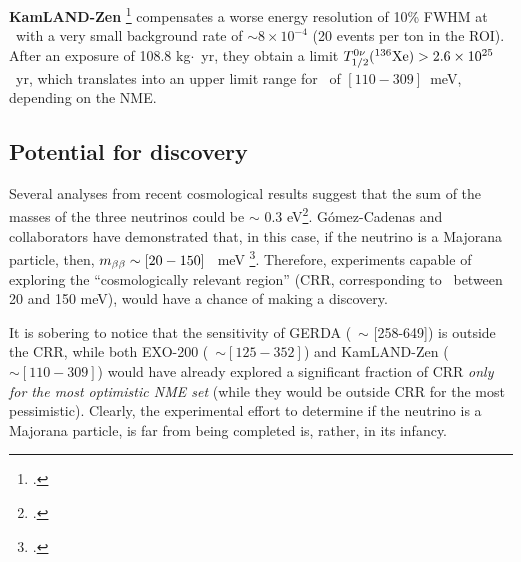 {\bf KamLAND-Zen} \footcite{TheKamLAND-Zen:2014lma} compensates a worse energy resolution of 10\% FWHM at \Qbb\ with a very small background rate of $\sim 8 \times 10^{-4}$ \ckky (20 events per ton in the ROI). After an exposure of 108.8 kg$\cdot$~yr, they obtain a limit  $T_{1/2}^{0\nu}({}^{136}\rm Xe) > 2.6 \times 10^{25}$~yr, which translates into an upper limit range for \mbb\ of $[110-309]$~meV, depending on the NME.

 \subsection*{Potential for discovery}
 

 Several analyses from recent cosmological results suggest that the sum of the masses of the three neutrinos could be $\sim$ 0.3 eV\footcite{PhysRevLett.112.051303}. G\'omez-Cadenas and collaborators have demonstrated that, in this case, if the neutrino is a Majorana particle, then, $m_{\beta\beta} \sim [20-150]$~ meV \footcite{GomezCadenas:2013ue}. Therefore, experiments capable of exploring the ``cosmologically relevant region'' (CRR, corresponding to \mbb\ between  20 and 150 meV), would have a chance of making a discovery.
 
It is sobering to notice that  the sensitivity of GERDA (\mbb\ $\sim$ [258-649]) is outside the CRR, while both EXO-200 (\mbb\ $ \sim [125-352]$) and KamLAND-Zen ( \mbb\ $ \sim [110-309]$) would have already explored a significant fraction of CRR {\em only for the most optimistic NME set} (while they would be outside CRR for the most pessimistic). 
 Clearly, the experimental effort to determine if the neutrino is a Majorana particle, is far from being completed is, rather, in its infancy. 
% 
 
